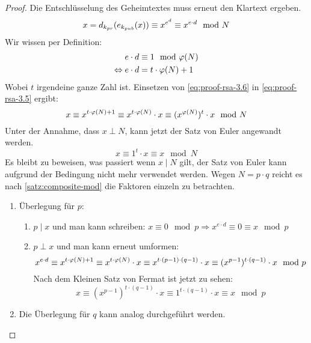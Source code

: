 \begin{proof}
  Die Entschlüsselung des Geheimtextes muss erneut den Klartext ergeben.
  \begin{equation}
    \label{eq:proof-rsa-3.5}
    x = d_{k_{pr}}(e_{k_{pub}}(x)) \equiv x^{e^d} \equiv x^{e \cdot d} \mod{N}
  \end{equation}
  Wir wissen per Definition:
  \begin{align}
    e \cdot d                 & \equiv 1 \mod{\varphi(N)} \notag \\
    \label{eq:proof-rsa-3.6}
    \Leftrightarrow e \cdot d & = t \cdot \varphi(N) + 1
  \end{align}
  Wobei  $t$ irgendeine ganze Zahl ist. Einsetzen von \eqref{eq:proof-rsa-3.6} in
  \eqref{eq:proof-rsa-3.5} ergibt:
  \begin{equation*}
    x \equiv x^{t \cdot \varphi(N) + 1} \equiv x^{t \cdot \varphi(N)} \cdot x \equiv
    (x^{\varphi(N)})^t \cdot x \mod{N}
  \end{equation*}
  Unter der Annahme, dass $x \perp N$, kann jetzt der Satz von Euler angewandt werden.
  \begin{equation*}
    x \equiv 1^t \cdot x \equiv x \mod{N}
  \end{equation*}
  Es bleibt zu beweisen, was passiert wenn $x \mid N$ gilt, der Satz von Euler kann
  aufgrund der Bedingung nicht mehr verwendet werden. Wegen $N = p \cdot q$ reicht es
  nach \autoref{satz:composite-mod} die Faktoren einzeln zu betrachten.
  \begin{enumerate}
    \item Überlegung für $p$:
          \begin{enumerate}[topsep=0pt]
            \item $p \mid x$ und man kann schreiben:
                  $x \equiv 0 \mod{p} \Rightarrow x^{e \cdot d} \equiv 0 \equiv x \mod{p}$
            \item $p \perp x$ und man kann erneut umformen:
                  \begin{equation*}
                    x^{e \cdot d} \equiv x^{t \cdot \varphi(N) + 1} \equiv
                    x^{t \cdot \varphi(N)} \cdot x \equiv
                    x^{t \cdot (p - 1) \cdot (q - 1)} \cdot x \equiv
                    (x^{p - 1})^{t \cdot (q - 1)} \cdot x \mod{p}
                  \end{equation*}
                  Nach dem Kleinen Satz von Fermat ist jetzt zu sehen:
                  \begin{equation*}
                    x \equiv (x^{p - 1})^{t \cdot (q - 1)} \cdot x \equiv
                    1^{t \cdot (q - 1)} \cdot x \equiv x \mod{p}
                  \end{equation*}
          \end{enumerate}
    \item Die Überlegung für $q$ kann analog durchgeführt werden.
  \end{enumerate}
\end{proof}

\begin{example}

\end{example}